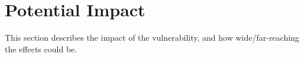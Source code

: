 \section{Potential Impact}

This section describes the impact of the vulnerability, and how wide/far-reaching the effects could be. 
